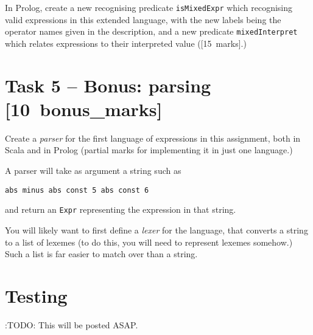 \documentclass[11pt]{article}
\begin{document}
In Prolog, create a new recognising predicate \texttt{isMixedExpr} which
recognising valid expressions in this extended language,
with the new labels being the operator names given in the description,
and a new predicate \texttt{mixedInterpret} which relates
expressions to their interpreted value ([15 marks].)

\section*{Task 5 – Bonus: parsing                [10 bonus\_marks]}
\label{sec:orgb8f30ed}
Create a \emph{parser} for the first language of expressions
in this assignment, both in Scala and in Prolog
(partial marks for implementing it in just one language.)

A parser will take as argument a string such as
\begin{verbatim}
abs minus abs const 5 abs const 6
\end{verbatim}
and return an \texttt{Expr} representing the expression in that string.

You will likely want to first define a \emph{lexer} for the language,
that converts a string to a list of lexemes
(to do this, you will need to represent lexemes somehow.)
Such a list is far easier to match over than a string.

\section*{Testing}
\label{sec:org8e80944}
:TODO: This will be posted ASAP.
\end{document}
